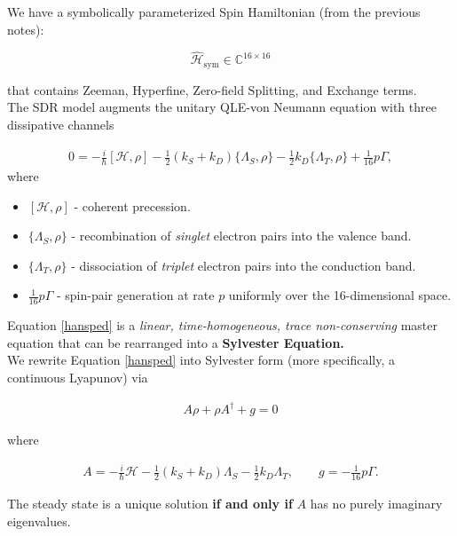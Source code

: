 \documentclass[svgnames]{article}
\begin{document}
We have a symbolically parameterized Spin Hamiltonian (from the previous notes): 

\[
\hat{\mathcal{H}}_\text{sym} \in \mathbb{C}^{16\times 16} 
\] \vspace{3px}

that contains Zeeman, Hyperfine, Zero-field Splitting, and Exchange terms. \\ 

The SDR model augments the unitary QLE-von Neumann equation with three
dissipative channels 

\begin{align} \label{hansped}
    0 = -\frac{i}{\hbar}[\mathcal{H} , \rho] - \frac{1}{2}(k_S + k_D)
    \{\Lambda_S, \rho\} - \frac{1}{2}k_D \{\Lambda_T, \rho\} +
    \frac{1}{16}p\Gamma, 
\end{align} 
where 
\begin{itemize}
    \item[.] $[\mathcal{H} , \rho]$ - coherent precession. 
    \item[.] $\{\Lambda_S, \rho\}$ - recombination of  \textit{singlet} electron
        pairs into the valence band. 
    \item[.] $\{\Lambda_T, \rho\}$ - dissociation of  \textit{triplet} electron
        pairs into the conduction band. 
    \item[.] $\frac{1}{16}p\Gamma$ - spin-pair generation at rate $p$ 
        uniformly over the 16-dimensional space. 
\end{itemize}

Equation \ref{hansped} is a \textit{linear, time-homogeneous, trace
non-conserving} master equation that can be rearranged into a \textbf{Sylvester
Equation.}\\ 

We rewrite Equation \ref{hansped} into Sylvester form (more specifically, a
continuous Lyapunov) via 

\begin{align}\label{sylvfull}
A\rho + \rho A^\dagger + g = 0 
\end{align}

where 

\begin{align} \label{sylv}
    A = -\frac{i}{\hbar}\mathcal{H} - \frac{1}{2}(k_S + k_D) \Lambda_S -
    \frac{1}{2}k_D\Lambda_T, \qquad g = -\frac{1}{16}p\Gamma.
\end{align}

The steady state is a unique solution \textbf{if and only if} $A$ has no purely
imaginary eigenvalues. 
\end{document}
